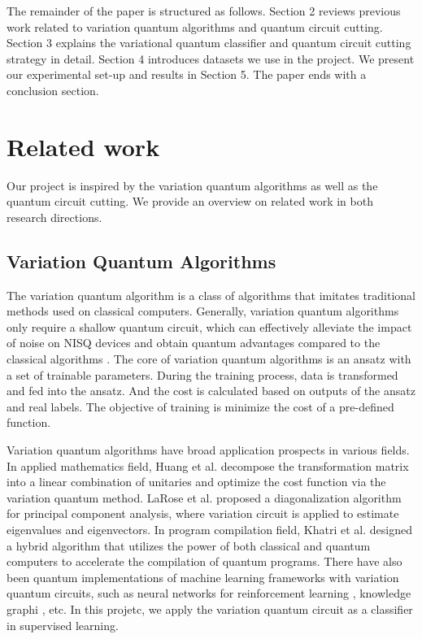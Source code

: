 \documentclass[sigconf]{acmart}
\begin{document}
The remainder of the paper is structured as follows. Section 2 reviews previous work related to variation quantum algorithms and quantum circuit cutting. Section 3 explains the variational quantum classifier and quantum circuit cutting strategy in detail. Section 4 introduces datasets we use in the project. We present our experimental set-up and results in Section 5. The paper ends with a conclusion section.

\section{Related work}

Our project is inspired by the variation quantum algorithms as well as the quantum circuit cutting. We provide an overview on related work in both research directions.

\subsection{Variation Quantum Algorithms}
The variation quantum algorithm is a class of algorithms that imitates traditional methods used on classical computers. Generally, variation quantum algorithms only require a shallow quantum circuit, which can effectively alleviate the impact of noise on NISQ devices and obtain quantum advantages compared to the classical algorithms \cite{cerezo2021}. The core of variation quantum algorithms is an ansatz with a set of trainable parameters. During the training process, data is transformed and fed into the ansatz. And the cost is calculated based on outputs of the ansatz and real labels. The objective of training is minimize the cost of a pre-defined function.

Variation quantum algorithms have broad application prospects in various fields. In applied mathematics field, Huang et al. \cite{vqa-huang} decompose the transformation matrix into a linear combination of unitaries and optimize the cost function via the variation quantum method. LaRose et al. \cite{vqa-larose} proposed a diagonalization algorithm for principal component analysis, where variation circuit is applied to estimate eigenvalues and eigenvectors. In program compilation field, Khatri et al. \cite{vqa-qc} designed a hybrid algorithm that utilizes the power of both classical and quantum computers to accelerate the compilation of quantum programs. There have also been quantum implementations of machine learning frameworks with variation quantum circuits, such as neural networks for reinforcement learning \cite{vqa-rl}, knowledge graphi \cite{vqa-kg}, etc. In this projetc, we apply the variation quantum circuit as a classifier in supervised learning.
\end{document}
